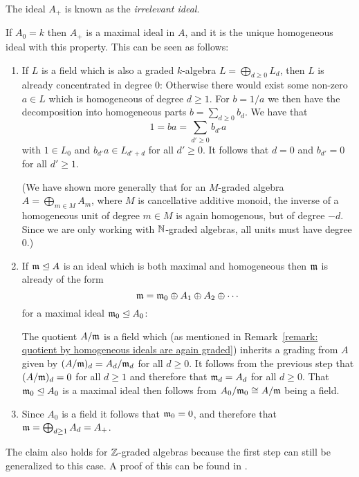 \begin{remark}
  The ideal $A_+$ is known as the \emph{irrelevant ideal}.
  
  If $A_0 = k$ then $A_+$ is a maximal ideal in $A$, and it is the unique homogeneous ideal with this property.
  This can be seen as follows:
  \begin{enumerate}[label=\arabic*)]
    \item
      If $L$ is a field which is also a graded $k$-algebra $L = \bigoplus_{d \geq 0} L_d$, then $L$ is already concentrated in degree $0$:
      Otherwise there would exist some non-zero $a \in L$ which is homogeneous of degree $d \geq 1$.
      For $b = 1/a$ we then have the decomposition into homogeneous parts $b = \sum_{d \geq 0} b_d$.
      We have that
      \[
          1
        = b a
        = \sum_{d' \geq 0} b_{d'} a
      \]
      with $1 \in L_0$ and $b_{d'} a \in L_{d' + d}$ for all $d' \geq 0$.
      It follows that $d = 0$ and $b_{d'} = 0$ for all $d' \geq 1$.
      
      (We have shown more generally that for an $M$-graded algebra $A = \bigoplus_{m \in M} A_m$, where $M$ is cancellative additive monoid, the inverse of a homogeneous unit of degree $m \in M$ is again homogenous, but of degree $-d$.
      Since we are only working with $\mathbb{N}$-graded algebras, all units must have degree $0$.)
    \item
      If $\mathfrak{m} \trianglelefteq A$ is an ideal which is both maximal and homogeneous then $\mathfrak{m}$ is already of the form
      \[
          \mathfrak{m}
        = \mathfrak{m}_0 \oplus A_1 \oplus A_2 \oplus \dotsb
      \]
      for a maximal ideal $\mathfrak{m}_0 \trianglelefteq A_0$:
      
      The quotient $A/\mathfrak{m}$ is a field which (as mentioned in Remark~\ref{remark: quotient by homogeneous ideals are again graded}) inherits a grading from $A$ given by $(A/\mathfrak{m})_d = A_d / \mathfrak{m}_d$ for all $d \geq 0$.
      It follows from the previous step that $(A/\mathfrak{m})_d = 0$ for all $d \geq 1$ and therefore that $\mathfrak{m}_d = A_d$ for all $d \geq 0$.
      That $\mathfrak{m}_0 \trianglelefteq A_0$ is a maximal ideal then follows from $A_0/\mathfrak{m}_0 \cong A/\mathfrak{m}$ being a field.
    \item
      Since $A_0$ is a field it follows that $\mathfrak{m}_0 = 0$, and therefore that $\mathfrak{m} = \bigoplus_{d \geq 1} A_d = A_+$.
  \end{enumerate}
  The claim also holds for $\mathbb{Z}$-graded algebras because the first step can still be generalized to this case.
  A proof of this can be found in \cite[Remark 1.3.10]{GradedRings2004}.
\end{remark}


